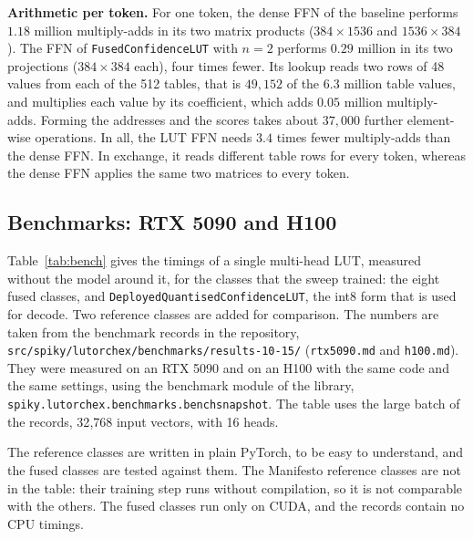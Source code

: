 \documentclass[11pt]{article}
\DeclareRobustCommand{\code}[1]{{\renewcommand{\_}{\textunderscore\allowbreak}\texttt{#1}}}
\begin{document}
\textbf{Arithmetic per token.} For one token, the dense FFN of the baseline performs $1.18$ million
multiply-adds in its two matrix products ($384\times1536$ and $1536\times384$). The FFN of
\code{FusedConfidenceLUT} with $n=2$ performs $0.29$ million in its two projections ($384\times384$ each),
four times fewer. Its lookup reads two rows of 48 values from each of the 512 tables, that is $49{,}152$ of
the $6.3$ million table values, and multiplies each value by its coefficient, which adds $0.05$ million
multiply-adds. Forming the addresses and the scores takes about $37{,}000$ further element-wise operations.
In all, the LUT FFN needs $3.4$ times fewer multiply-adds than the dense FFN. In exchange, it reads
different table rows for every token, whereas the dense FFN applies the same two matrices to every token.

\subsection{Benchmarks: RTX 5090 and H100}
\label{sec:bench}

Table~\ref{tab:bench} gives the timings of a single multi-head LUT, measured without the model around it,
for the classes that the sweep trained: the eight fused classes, and \code{DeployedQuantisedConfidenceLUT},
the int8 form that is used for decode. Two reference classes are added for comparison. The numbers are
taken from the benchmark records in the repository, \code{src/spiky/lutorch\_ex/benchmarks/results\_2026-10-15/}
(\code{rtx5090.md} and \code{h100.md}). They were measured on an RTX 5090 and on an H100 with the same code
and the same settings, using the benchmark module of the library,
\code{spiky.lutorch\_ex.benchmarks.bench\_snapshot}. The table uses the large batch of the records,
32{,}768 input vectors, with 16 heads.

The reference classes are written in plain PyTorch, to be easy to understand, and the fused classes are
tested against them. The Manifesto reference classes are not in the table: their training step runs
without compilation, so it is not comparable with the others. The fused classes run only on CUDA, and the
records contain no CPU timings.
\end{document}
